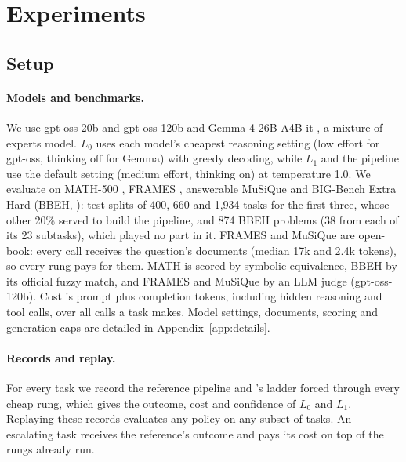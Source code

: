 \section{Experiments}
\label{sec:results}

\subsection{Setup}
\label{sec:setup}

\paragraph{Models and benchmarks.} We use gpt-oss-20b and gpt-oss-120b \citep{openai2025gptoss} and
Gemma-4-26B-A4B-it \citep{google2026gemma4}, a mixture-of-experts model. $L_0$ uses each model's cheapest
reasoning setting (low effort for gpt-oss, thinking off for Gemma) with greedy decoding, while $L_1$ and the
pipeline use the default setting (medium effort, thinking on) at temperature 1.0. We evaluate on MATH-500
\citep{hendrycks2021math,lightman2024verify}, FRAMES \citep{krishna2025frames}, answerable MuSiQue
\citep{trivedi2022musique} and BIG-Bench Extra Hard (BBEH, \citealp{kazemi2025bbeh}): test splits of 400,
660 and 1{,}934 tasks for the first three, whose other 20\% served to build the pipeline, and 874 BBEH
problems (38 from each of its 23 subtasks), which played no part in it. FRAMES and MuSiQue are open-book: every call receives
the question's documents (median 17k and 2.4k tokens), so every rung pays for them. MATH is scored by
symbolic equivalence, BBEH by its official fuzzy match, and FRAMES and MuSiQue by an LLM judge
(gpt-oss-120b). Cost is prompt plus completion tokens, including hidden reasoning and tool calls, over all
calls a task makes. Model settings, documents, scoring and generation caps are detailed in
Appendix~\ref{app:details}.

\paragraph{Records and replay.} For every task we record the reference pipeline and \climb{}'s ladder
forced through every cheap rung, which gives the outcome, cost and confidence of $L_0$ and $L_1$.
Replaying these records evaluates any policy on any subset of tasks. An escalating task receives the
reference's outcome and pays its cost on top of the rungs already run.


